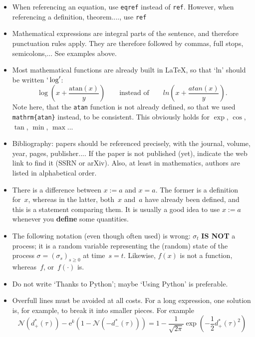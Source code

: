 \documentclass[a4paper, twoside]{report}
\theoremstyle{definition}
\newcommand{\E}{\mathrm{e}}
\numberwithin{equation}{section}
\begin{document}
\begin{itemize}
  \item When referencing an equation, use \texttt{eqref} instead of \texttt{ref}.
        However, when referencing a definition, theorem...., use \texttt{ref}
  \item Mathematical expressions are integral parts of the sentence,
        and therefore punctuation rules apply.
        They are therefore followed by commas, full stops, semicolons,... See examples above.
  \item Most mathematical functions are already built in \LaTeX,
        so that `ln' should be written $`\log'$:
        $$
          \log\left(x + \frac{\mathrm{atan}(x)}{y}\right)
          \qquad\text{instead of}\qquad
          ln\left(x + \frac{atan(x)}{y}\right).
        $$
        Note here, that the \texttt{atan} function is not already defined,
        so that we used \texttt{mathrm\{atan\}} instead, to be consistent.
        This obviously holds for $\exp$, $\cos$, $\tan$, $\min$, $\max$...
  \item Bibliography: papers should be referenced precisely, with the journal, volume, year, pages, publisher....
        If the paper is not published (yet), indicate the web link to find it (SSRN or arXiv).
        Also, at least in mathematics, authors are listed in alphabetical order.
  \item There is a difference between $x:=a$ and $x=a$.
        The former is a definition for~$x$, whereas in the latter, both~$x$ and~$a$ have already been defined,
        and this is a statement comparing them.
        It is usually a good idea to use $x:=a$ whenever you \textbf{define} some quantities.
  \item The following notation (even though often used) is wrong:
        $\sigma_t$ \textbf{IS NOT} a process; it is a random variable representing the (random) state
        of the process $\sigma=(\sigma_s)_{s\geq 0}$ at time~$s=t$.
        Likewise, $f(x)$ is not a function, whereas~$f$, or~$f(\cdot)$ is.
  \item Do not write `Thanks to \textrm{Python}'; maybe `Using \textrm{Python}' is preferable.
  \item Overfull lines must be avoided at all costs. For a long expression, one solution is, for example,
        to break it into smaller pieces.
        For example
        $$
          \mathcal{N}\left(d_+^*(\tau)\right)-\E^k\left(1-\mathcal{N}\left(-d_-^*(\tau)\right)\right)
          = 1- \frac{1}{\sqrt{2\pi}}\exp\left(-\frac{1}{2}d_{+}^*(\tau)^2\right)
$$
\end{itemize}
\end{document}
